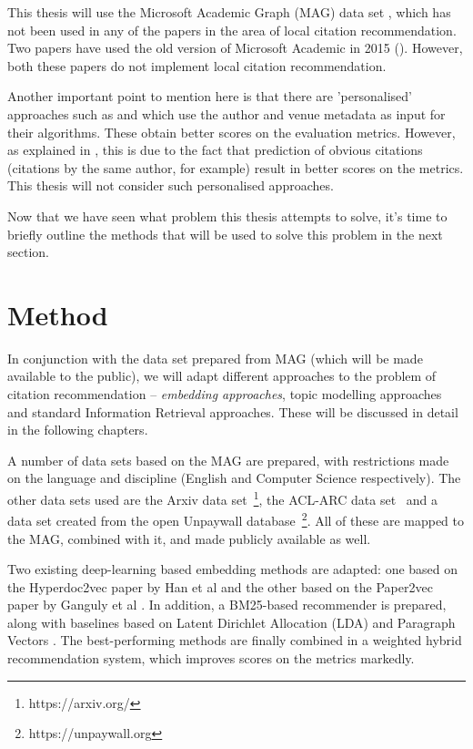 This thesis will use the Microsoft Academic Graph (MAG) data set \cite{Sinha2015}, which has not been used in any of the papers in the area of local citation recommendation. Two papers have used the old version of Microsoft Academic in 2015 (\cite{ChakrabortyMNN15, Gao15}). However, both these papers do not implement local citation recommendation. 

Another important point to mention here is that there are 'personalised' approaches such as \cite{Ebesu2017} and \cite{YangZCDMGD18} which use the author and venue metadata as input for their algorithms. These obtain better scores on the evaluation metrics. However, as explained in \cite{Bhagavatula2018}, this is due to the fact that prediction of obvious citations (citations by the same author, for example) result in better scores on the metrics. This thesis will not consider such personalised approaches.

Now that we have seen what problem this thesis attempts to solve, it's time to briefly outline the methods that will be used to solve this problem in the next section.
\section{Method}
In conjunction with the data set prepared from MAG (which will be made available to the public), we will adapt different approaches to the problem of citation recommendation -- \textit{embedding approaches}, topic modelling approaches and standard Information Retrieval approaches. These will be discussed in detail in the following chapters.

A number of data sets based on the MAG are prepared, with restrictions made on the language and discipline (English and Computer Science respectively). The other data sets used are the Arxiv data set~\footnote{https://arxiv.org/}, the ACL-ARC data set~\cite{BirdDDGJKLPRT08} and a data set created from the open Unpaywall database~\footnote{https://unpaywall.org}. All of these are mapped to the MAG, combined with it, and made publicly available as well. 

Two existing deep-learning based embedding methods are adapted: one based on the Hyperdoc2vec paper by Han et al \cite{ShiSZZH18} and the other based on the Paper2vec paper by Ganguly et al \cite{GangulyP17}. In addition, a BM25-based recommender is prepared, along with baselines based on Latent Dirichlet Allocation (LDA) \cite{BleiNJ03} and Paragraph Vectors \cite{LeM14}. The best-performing methods are finally combined in a weighted hybrid recommendation system, which improves scores on the metrics markedly. 

